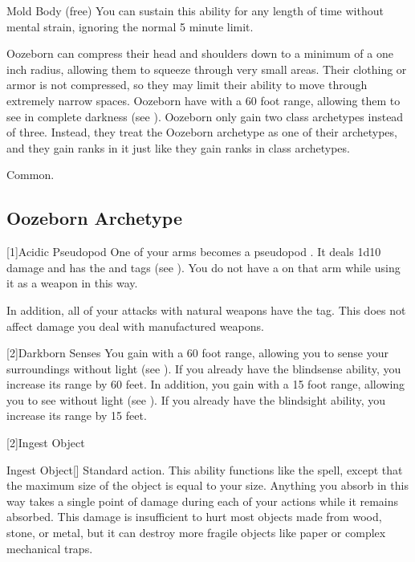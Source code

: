 \begin{itemize}
\begin{sustainability}{Mold Body}{ (free)}
        You can sustain this ability for any length of time without mental strain, ignoring the normal 5 minute limit.
      \end{sustainability}
     Oozeborn can compress their head and shoulders down to a minimum of a one inch radius, allowing them to squeeze through very small areas.
      Their clothing or armor is not compressed, so they may limit their ability to move through extremely narrow spaces.
     Oozeborn have  with a 60 foot range, allowing them to see in complete darkness (see ).
     Oozeborn only gain two class archetypes instead of three.
      Instead, they treat the Oozeborn archetype as one of their archetypes, and they gain ranks in it just like they gain ranks in class archetypes.
  \end{itemize}
   Common.

  \subsection{Oozeborn Archetype}

    [1]{Acidic Pseudopod} One of your arms becomes a pseudopod .
      It deals 1d10 damage and has the \atAcid and  tags (see ).
      You do not have a  on that arm while using it as a weapon in this way.

      In addition, all of your attacks with natural weapons have the \atAcid tag.
      This does not affect damage you deal with manufactured weapons.

    [2]{Darkborn Senses} You gain  with a 60 foot range, allowing you to sense your surroundings without light (see ).
      If you already have the blindsense ability, you increase its range by 60 feet.
      In addition, you gain  with a 15 foot range, allowing you to see without light (see ).
      If you already have the blindsight ability, you increase its range by 15 feet.

    [2]{Ingest Object}
      \begin{activeability}{Ingest Object}[\atAcid]
        \abilityusagetime Standard action.
        \rankline
        This ability functions like the  spell, except that the maximum size of the object is equal to your size.
        Anything you absorb in this way takes a single point of  damage during each of your actions while it remains absorbed.
        This damage is insufficient to hurt most objects made from wood, stone, or metal, but it can destroy more fragile objects like paper or complex mechanical traps.
      \end{activeability}

